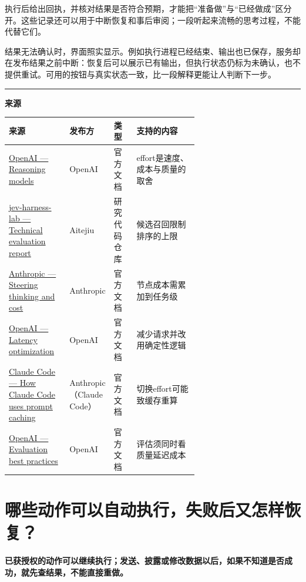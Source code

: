 \documentclass[a4paper,11pt]{ctexart}
\begin{document}
执行后给出回执，并核对结果是否符合预期，才能把“准备做”与“已经做成”区分开。这些记录还可以用于中断恢复和事后审阅；一段听起来流畅的思考过程，不能代替它们。

结果无法确认时，界面照实显示。例如执行进程已经结束、输出也已保存，服务却在发布结果之前中断：恢复后可以展示已有输出，但执行状态仍标为未确认，也不提供重试。可用的按钮与真实状态一致，比一段解释更能让人判断下一步。

\bigskip\noindent\rule{\linewidth}{0.4pt}\par\smallskip
\begingroup\footnotesize\color{slate}
\textbf{来源}\par\smallskip
\setlength{\tabcolsep}{4pt}\renewcommand{\arraystretch}{1.2}\keepXColumns
\begin{tabularx}{\linewidth}{L{0.32\linewidth} L{0.20\linewidth} L{0.12\linewidth} X}
\toprule
\textbf{来源} & \textbf{发布方} & \textbf{类型} & \textbf{支持的内容} \\
\midrule
\href{https://developers.openai.com/api/docs/guides/reasoning}{OpenAI — Reasoning models} & OpenAI & 官方文档 & effort是速度、成本与质量的取舍 \\
\href{https://github.com/Aitejiu/jev-harness-lab/blob/main/docs/REPORT.md}{jev-harness-lab — Technical evaluation report} & Aitejiu & 研究代码仓库 & 候选召回限制排序的上限 \\
\href{https://platform.claude.com/docs/en/build-with-claude/thinking-steering-and-cost}{Anthropic — Steering thinking and cost} & Anthropic & 官方文档 & 节点成本需累加到任务级 \\
\href{https://developers.openai.com/api/docs/guides/latency-optimization}{OpenAI — Latency optimization} & OpenAI & 官方文档 & 减少请求并改用确定性逻辑 \\
\href{https://code.claude.com/docs/en/prompt-caching}{Claude Code — How Claude Code uses prompt caching} & Anthropic（Claude Code） & 官方文档 & 切换effort可能致缓存重算 \\
\href{https://developers.openai.com/api/docs/guides/evaluation-best-practices}{OpenAI — Evaluation best practices} & OpenAI & 官方文档 & 评估须同时看质量延迟成本 \\
\bottomrule
\end{tabularx}
\endgroup

\clearpage
\section{哪些动作可以自动执行，失败后又怎样恢复？}
\noindent\textbf{已获授权的动作可以继续执行；发送、披露或修改数据以后，如果不知道是否成功，就先查结果，不能直接重做。}\par\medskip
\end{document}
